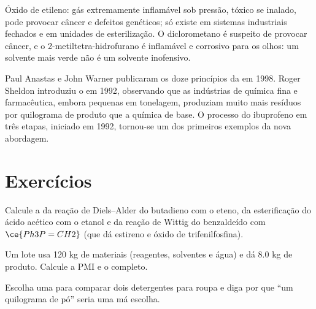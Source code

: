 \begin{safety}{}
Óxido de etileno: gás extremamente inflamável sob pressão, tóxico se inalado, pode
provocar câncer e defeitos genéticos; só existe em sistemas industriais fechados
e em unidades de esterilização. O diclorometano é suspeito de provocar câncer, e o
2-metiltetra-hidrofurano é inflamável e corrosivo para os olhos: um solvente mais verde
não é um solvente inofensivo.
\end{safety}

\begin{history}
Paul Anastas e John Warner publicaram os doze princípios da  em 1998. Roger Sheldon introduziu o  em 1992, observando que
as indústrias de química fina e farmacêutica, embora pequenas em tonelagem,
produziam muito mais resíduos por quilograma de produto que a química de base. O
processo do ibuprofeno em três etapas, iniciado em 1992, tornou-se um dos primeiros
exemplos da nova abordagem.
\end{history}

\section{Exercícios}

\begin{exercise}[$\star$]\label{exo:b3:green-industrial:1}
Calcule a  da reação de Diels--Alder do butadieno com o eteno, da
esterificação do ácido acético com o etanol e da reação de Wittig do
benzaldeído com $\ce{Ph3P=CH2}$ (que dá estireno e óxido de trifenilfosfina).
\end{exercise}

\begin{exercise}[$\star$]\label{exo:b3:green-industrial:2}
Um lote usa 120 kg de materiais (reagentes, solventes e água) e dá 8.0 kg de
produto. Calcule a PMI e o  completo.
\end{exercise}

\begin{exercise}[$\star$]\label{exo:b3:green-industrial:3}
Escolha uma  para comparar dois detergentes para roupa e diga por que
``um quilograma de pó'' seria uma má escolha.
\end{exercise}

